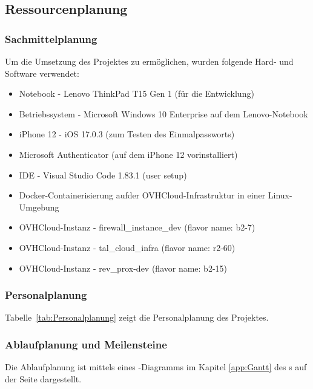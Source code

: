 \subsection{Ressourcenplanung}
\label{sec:Ressourcenplanung}

\subsubsection{Sachmittelplanung}
\label{sec:Sachmittelplanung}
Um die Umsetzung des Projektes zu ermöglichen, wurden folgende Hard- und Software verwendet:
\begin{itemize} [label=--]
	\item Notebook - Lenovo ThinkPad T15 Gen 1 (für die Entwicklung)
	\item Betriebssystem - Microsoft Windows 10 Enterprise auf dem Lenovo-Notebook
	\item iPhone 12 - iOS 17.0.3 (zum Testen des Einmalpassworts)
	\item Microsoft Authenticator (auf dem iPhone 12 vorinstalliert)
	\item IDE - Visual Studio Code 1.83.1 (user setup)
	\item Docker-Containerisierung aufder OVHCloud-Infrastruktur in einer Linux-Umgebung
	\item OVHCloud-Instanz - firewall\_instance\_dev (flavor name: b2-7)
	\item OVHCloud-Instanz - tal\_cloud\_infra (flavor name: r2-60)
	\item OVHCloud-Instanz - rev\_prox-dev (flavor name: b2-15)
\end{itemize}

\subsubsection{Personalplanung}
\label{sec:Personalplanung}
Tabelle~\ref{tab:Personalplanung} zeigt die Personalplanung des Projektes.

\subsubsection{Ablaufplanung und Meilensteine}
\label{sec:Ablaufplaung und Meilensteine}
Die Ablaufplanung ist mittels eines -Diagramms im Kapitel \ref{app:Gantt} des s 
auf der Seite \pageref{app:Gantt} dargestellt.

